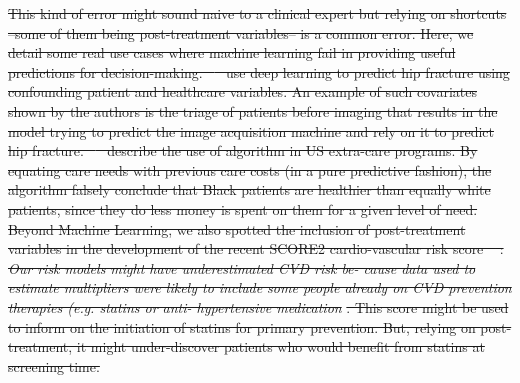 \documentclass[10pt,letterpaper]{article}
\providecommand{\DIFdeltex}[1]{{\protect\color{red}\sout{#1}}}                      %
\providecommand{\DIFdel}[1]{\texorpdfstring{\DIFdeltex{#1}}{}} %
\begin{document}
\DIFdel{This kind of error might sound naive to a clinical expert but relying on
  shortcuts --some of them being post-treatment variables-- is a common error.
  Here, we detail some real use cases where machine learning fail in providing
  useful predictions for decision-making. \mbox{%
    \cite{badgeley2019deep} }\hskip0pt%
  use deep
  learning to predict hip fracture using confounding patient and healthcare
  variables. An example of such covariates shown by the authors is the triage of
  patients before imaging that results in the model trying to predict the image
  acquisition machine and rely on it to predict hip fracture.
  \mbox{%
    \cite{obermeyer2019dissecting} }\hskip0pt%
  describe the use of algorithm in US extra-care
  programs. By equating care needs with previous care costs (in a pure
  predictive fashion), the algorithm falsely conclude that Black patients are
  healthier than equally white patients, since they do less money is spent on
  them for a given level of need. Beyond Machine Learning, we also spotted the
  inclusion of post-treatment variables in the development of the recent SCORE2
  cardio-vascular risk score \mbox{%
    \cite{score22021score2}}\hskip0pt%
  : }\emph{\DIFdel{Our risk models
    might have underestimated CVD risk be- cause data used to estimate multipliers
    were likely to include some people already on CVD prevention therapies (e.g.
    statins or anti- hypertensive medication}}%
\DIFdel{. This score might be used to inform
  on the initiation of statins for primary prevention. But, relying on
  post-treatment, it might under-discover patients who would benefit from
  statins at screening time.
}%
\end{document}
